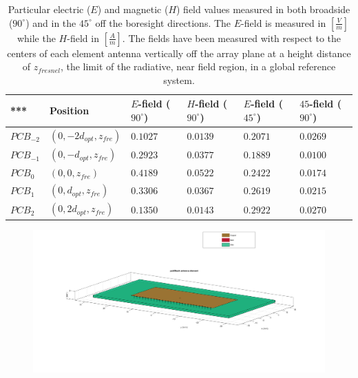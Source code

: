 \documentclass[12pt,a4paper]{article}
\begin{document}
{%
\begin{table}
	\begin{center}
		{\selectfont	\begin{tabular}{||m{1.8cm}|m{2.6cm}|m{2.6cm}|m{2.6cm}|m{2.6cm}|m{2.6cm}||}
				\hline
				*** & Position & $E$-field ($90^\circ$) & $H$-field ($90^\circ$) & $E$-field ($45^\circ$) & $45$-field ($90^\circ$) \\
						\hline 
			$PCB_{-2}$ & $(0,-2d_{opt},z_{fre})$ & $0.1027$ & $0.0139$ & $0.2071$ & $0.0269$ \\ 
			\hline
				$PCB_{-1}$ & $(0,-d_{opt},z_{fre})$ & $0.2923$ & $0.0377$ & $0.1889$ & $0.0100$ \\
				\hline
				$PCB_0$ & $(0,0,z_{fre})$& $0.4189$& $0.0522$& $0.2422$ & $0.0174$ \\
				\hline 
				$PCB_1$ & $(0,d_{opt},z_{fre})$ & $0.3306$ & $0.0367$ & $0.2619$ & $0.0215$ \\
				\hline 
				$PCB_2$ & $(0,2d_{opt},z_{fre})$ & $0.1350$ & $0.0143$ & $0.2922$ & $0.0270$ \\ 
				\hline
			\end{tabular}}
		\caption{Particular electric ($E$) and magnetic ($H$) field values measured in both broadside ($90^\circ$) and in the $45^\circ$ off the boresight directions. The $E$-field is measured in $\left[\frac{V}{m}\right]$ while the $H$-field in $\left[\frac{A}{m}\right]$. The fields have been measured with respect to the centers of each element antenna vertically off the array plane at a height distance of $z_{fresnel}$, the limit of the radiative, near field region, in a global reference system.}
		\label{table:EH fields}
		\end{center}
	\end{table} 
\begin{center}
	\begin{figure}[h]
		\includegraphics[scale=0.2]{pcb_shorting_pins_3d_view.pdf}

\end{figure}
\end{center}}
\end{document}
